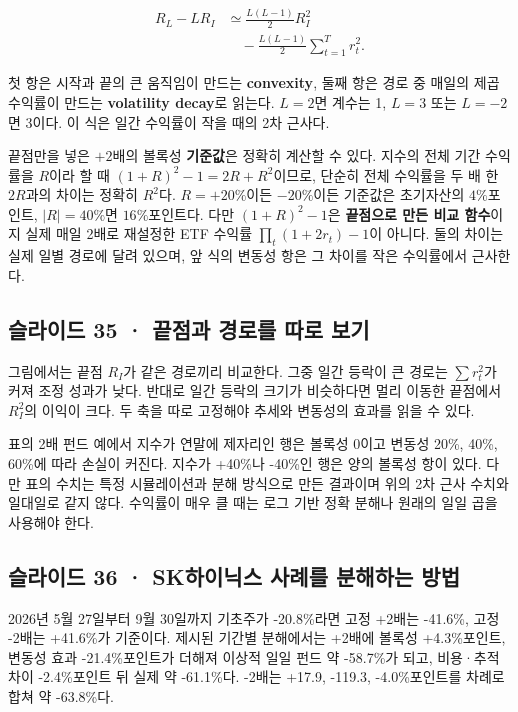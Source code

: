 \documentclass[11pt,a4paper]{article}
\begin{document}
\[
\begin{aligned}
R_L-LR_I&\simeq \frac{L(L-1)}{2}R_I^2\\
&\quad-\frac{L(L-1)}{2}\sum_{t=1}^T r_t^2.
\end{aligned}
\]

첫 항은 시작과 끝의 큰 움직임이 만드는 \textbf{convexity}, 둘째 항은 경로 중 매일의 제곱수익률이 만드는 \textbf{volatility decay}로 읽는다. $L=2$면 계수는 1, $L=3$ 또는 $L=-2$면 3이다. 이 식은 일간 수익률이 작을 때의 2차 근사다.\par

끝점만을 넣은 $+2$배의 볼록성 \textbf{기준값}은 정확히 계산할 수 있다. 지수의 전체 기간 수익률을 $R$이라 할 때 $(1+R)^2-1=2R+R^2$이므로, 단순히 전체 수익률을 두 배 한 $2R$과의 차이는 정확히 $R^2$다. $R=+20\%$이든 $-20\%$이든 기준값은 초기자산의 $4\%$포인트, $|R|=40\%$면 $16\%$포인트다. 다만 $(1+R)^2-1$은 \textbf{끝점으로 만든 비교 함수}이지 실제 매일 2배로 재설정한 ETF 수익률 $\prod_t(1+2r_t)-1$이 아니다. 둘의 차이는 실제 일별 경로에 달려 있으며, 앞 식의 변동성 항은 그 차이를 작은 수익률에서 근사한다.\par

\subsection{슬라이드 35 · 끝점과 경로를 따로 보기}
그림에서는 끝점 $R_I$가 같은 경로끼리 비교한다. 그중 일간 등락이 큰 경로는 $\sum r_t^2$가 커져 조정 성과가 낮다. 반대로 일간 등락의 크기가 비슷하다면 멀리 이동한 끝점에서 $R_I^2$의 이익이 크다. 두 축을 따로 고정해야 추세와 변동성의 효과를 읽을 수 있다.\par

표의 2배 펀드 예에서 지수가 연말에 제자리인 행은 볼록성 0이고 변동성 20\%, 40\%, 60\%에 따라 손실이 커진다. 지수가 +40\%나 -40\%인 행은 양의 볼록성 항이 있다. 다만 표의 수치는 특정 시뮬레이션과 분해 방식으로 만든 결과이며 위의 2차 근사 수치와 일대일로 같지 않다. 수익률이 매우 클 때는 로그 기반 정확 분해나 원래의 일일 곱을 사용해야 한다.\par

\subsection{슬라이드 36 · SK하이닉스 사례를 분해하는 방법}
2026년 5월 27일부터 9월 30일까지 기초주가 -20.8\%라면 고정 +2배는 -41.6\%, 고정 -2배는 +41.6\%가 기준이다. 제시된 기간별 분해에서는 +2배에 볼록성 +4.3\%포인트, 변동성 효과 -21.4\%포인트가 더해져 이상적 일일 펀드 약 -58.7\%가 되고, 비용·추적 차이 -2.4\%포인트 뒤 실제 약 -61.1\%다. -2배는 +17.9, -119.3, -4.0\%포인트를 차례로 합쳐 약 -63.8\%다.\par
\end{document}
